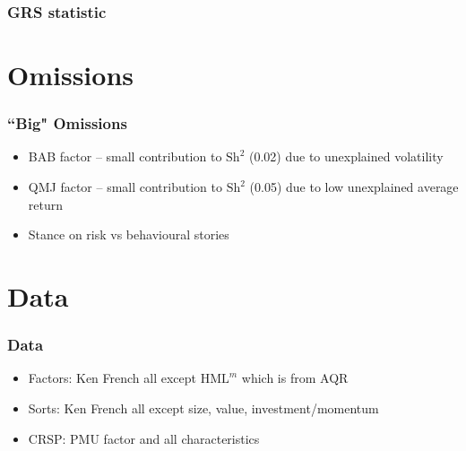 \documentclass{beamer}
\begin{document}
\begin{frame}
\frametitle{GRS statistic}
\begin{center}
\resizebox*{!}{\dimexpr\textheight-1.3cm\relax}{
    
    }
\end{center}
\end{frame}

\section{Omissions}

\begin{frame}
\frametitle{``Big" Omissions}
\begin{itemize}
    \item BAB factor -- small contribution to $\text{Sh}^2$ (0.02) due to
    unexplained volatility
    \item QMJ factor -- small contribution to $\text{Sh}^2$ (0.05) due to low
    unexplained average return
    \item Stance on risk vs behavioural stories
\end{itemize}
\end{frame}

\section{Data}

\begin{frame}
\frametitle{Data}
\begin{itemize}
    \item Factors: Ken French all except $\text{HML}^m$ which is from AQR
    \item Sorts: Ken French all except size, value, investment/momentum
    \item CRSP: PMU factor and all characteristics
\end{itemize}
\end{frame}
\end{document}

